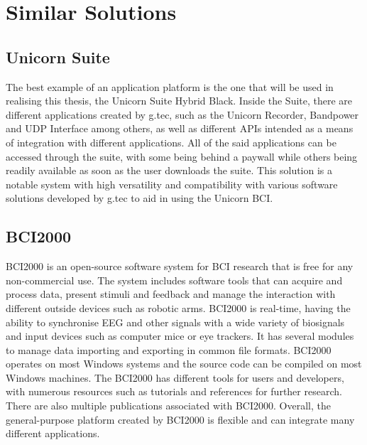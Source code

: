 \section{Similar Solutions}\label{sect:similar solutions}

\subsection{Unicorn Suite}
The best example of an application platform is the one that will be used in realising this thesis, the Unicorn Suite Hybrid Black. Inside the Suite, there are different applications created by g.tec, such as the Unicorn Recorder, Bandpower and UDP Interface among others, as well as different APIs intended as a means of integration with different applications. All of the said applications can be accessed through the suite, with some being behind a paywall while others being readily available as soon as the user downloads the suite\cite{Unicorn_Suite}. This solution is a notable system with high versatility and compatibility with various software solutions developed by g.tec to aid in using the Unicorn BCI.

\subsection{BCI2000}
BCI2000 is an open-source software system for BCI research that is free for any non-commercial use. The system includes software tools that can acquire and process data, present stimuli and feedback and manage the interaction with different outside devices such as robotic arms. BCI2000 is real-time, having the ability to synchronise EEG and other signals with a wide variety of biosignals and input devices such as computer mice or eye trackers. It has several modules to manage data importing and exporting in common file formats. BCI2000 operates on most Windows systems and the source code can be compiled on most Windows machines\cite{BCI2000}. The BCI2000 has different tools for users and developers, with numerous resources such as tutorials and references for further research. There are also multiple publications associated with BCI2000. Overall, the general-purpose platform created by BCI2000 is flexible and can integrate many different applications.

